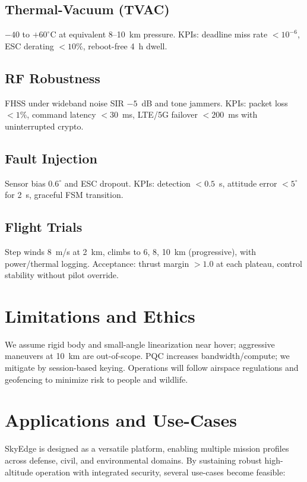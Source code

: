 \documentclass[conference]{IEEEtran}
\begin{document}
\subsection{Thermal-Vacuum (TVAC)}
$-40$ to $+60^\circ$C at equivalent 8--10~km pressure. KPIs: deadline miss rate $<10^{-6}$, ESC derating $<10\%$, reboot-free 4~h dwell.

\subsection{RF Robustness}
FHSS under wideband noise SIR $-5$~dB and tone jammers. KPIs: packet loss $<1\%$, command latency $<30$~ms, LTE/5G failover $<200$~ms with uninterrupted crypto.

\subsection{Fault Injection}
Sensor bias $0.6^\circ$ and ESC dropout. KPIs: detection $<0.5$~s, attitude error $<5^\circ$ for 2~s, graceful FSM transition.

\subsection{Flight Trials}
Step winds \SI{8}{m/s} at 2~km, climbs to 6, 8, 10~km (progressive), with power/thermal logging. Acceptance: thrust margin $>1.0$ at each plateau, control stability without pilot override.

\section{Limitations and Ethics}
We assume rigid body and small-angle linearization near hover; aggressive maneuvers at 10~km are out-of-scope. PQC increases bandwidth/compute; we mitigate by session-based keying. Operations will follow airspace regulations and geofencing to minimize risk to people and wildlife.

\section{Applications and Use-Cases}
SkyEdge is designed as a versatile platform, enabling multiple mission
profiles across defense, civil, and environmental domains. By sustaining
robust high-altitude operation with integrated security, several
use-cases become feasible:  
\end{document}
